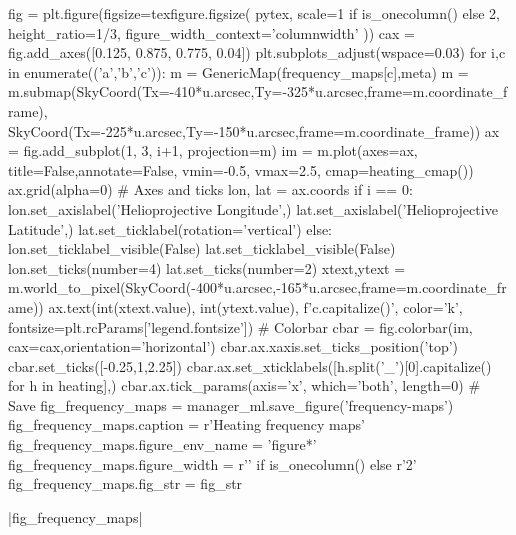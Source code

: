 \begin{pycode}[manager_ml]
fig = plt.figure(figsize=texfigure.figsize(
    pytex,
    scale=1 if is_onecolumn() else 2,
    height_ratio=1/3,
    figure_width_context='columnwidth'
))
cax = fig.add_axes([0.125, 0.875, 0.775, 0.04])
plt.subplots_adjust(wspace=0.03)
for i,c in enumerate(('a','b','c')):
    m = GenericMap(frequency_maps[c],meta)
    m = m.submap(SkyCoord(Tx=-410*u.arcsec,Ty=-325*u.arcsec,frame=m.coordinate_frame),
                 SkyCoord(Tx=-225*u.arcsec,Ty=-150*u.arcsec,frame=m.coordinate_frame))
    ax = fig.add_subplot(1, 3, i+1, projection=m)
    im = m.plot(axes=ax, title=False,annotate=False, vmin=-0.5, vmax=2.5, cmap=heating_cmap())
    ax.grid(alpha=0)
    # Axes and ticks
    lon, lat = ax.coords
    if i == 0:
        lon.set_axislabel('Helioprojective Longitude',)
        lat.set_axislabel('Helioprojective Latitude',)
        lat.set_ticklabel(rotation='vertical')
    else:
        lon.set_ticklabel_visible(False)
        lat.set_ticklabel_visible(False)
    lon.set_ticks(number=4)
    lat.set_ticks(number=2)
    xtext,ytext = m.world_to_pixel(SkyCoord(-400*u.arcsec,-165*u.arcsec,frame=m.coordinate_frame))
    ax.text(int(xtext.value), int(ytext.value), f'{c.capitalize()}', color='k', fontsize=plt.rcParams['legend.fontsize'])
# Colorbar
cbar = fig.colorbar(im, cax=cax,orientation='horizontal')
cbar.ax.xaxis.set_ticks_position('top')
cbar.set_ticks([-0.25,1,2.25])
cbar.ax.set_xticklabels([h.split('_')[0].capitalize() for h in heating],)
cbar.ax.tick_params(axis='x', which='both', length=0)
# Save
fig_frequency_maps = manager_ml.save_figure('frequency-maps')
fig_frequency_maps.caption = r'Heating frequency maps'
fig_frequency_maps.figure_env_name = 'figure*'
fig_frequency_maps.figure_width = r'\columnwidth' if is_onecolumn() else r'2\columnwidth'
fig_frequency_maps.fig_str = fig_str
\end{pycode}
\py[manager_ml]|fig_frequency_maps|

